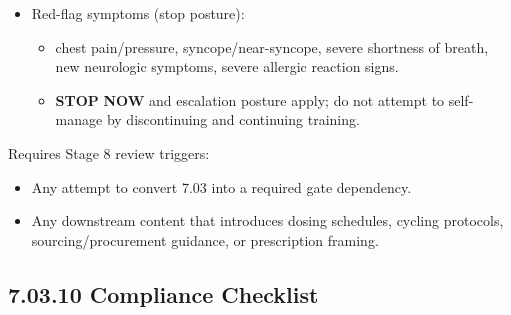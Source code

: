 \documentclass[10pt]{article}
\begin{document}
\begin{itemize}
  \begin{itemize}
  \item do not treat joint-support adjuncts as treatment; do not use them to justify unsafe load escalation; stop on adverse effects and seek evaluation when indicated.
  \end{itemize}
\item Red-flag symptoms (stop posture):
  \begin{itemize}
  \item chest pain/pressure, syncope/near-syncope, severe shortness of breath, new neurologic symptoms, severe allergic reaction signs.
  \item \textbf{STOP} \textbf{NOW} and escalation posture apply; do not attempt to self-manage by discontinuing and continuing training.
  \end{itemize}
\end{itemize}

Requires Stage 8 review triggers:

\begin{itemize}
\item Any attempt to convert 7.03 into a required gate dependency.
\item Any downstream content that introduces dosing schedules, cycling protocols, sourcing/procurement guidance, or prescription framing.
\end{itemize}

\subsection*{7.03.10 Compliance Checklist}
{}
\end{document}
